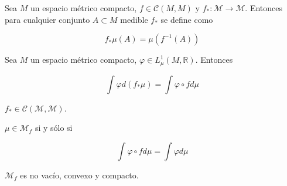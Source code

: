 \begin{definicion}
	Sea $M$ un espacio métrico compacto, $f \in \mathcal{C}(M,M)$ y $f_*: \mathcal{M} \rightarrow \mathcal{M}$. Entonces para cualquier conjunto $A \subset M$ medible $f_*$ se define como
	
	\begin{equation}
		f_*\mu(A) = \mu(f^{-1}(A))
	\end{equation}
\end{definicion}

\begin{lema}\label{lema1_krylov-bugoliubov}
	Sea $M$ un espacio métrico compacto, $\varphi \in L^1_\mu (M,\mathbb{R})$. Entonces
	
	\begin{equation}
		\int \varphi d(f_*\mu)=\int \varphi \circ f d\mu
	\end{equation}
\end{lema}

\begin{lema}
	$f_* \in \mathcal{C}(\mathcal{M},\mathcal{M})$. 
\end{lema}

\begin{lema}\label{lema3_krylov}
	$\mu \in \mathcal{M}_f$ si y sólo si
	
	\begin{equation}
		\int \varphi \circ f d\mu = \int \varphi d\mu
	\end{equation}
\end{lema}

\begin{teorema}
	$\mathcal{M}_f$ es no vacío, convexo y compacto.
\end{teorema}

